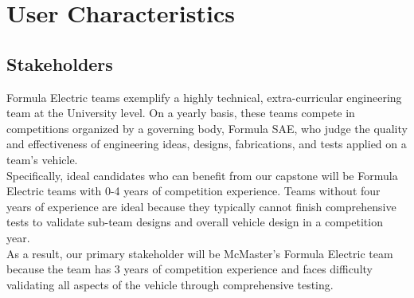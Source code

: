 \documentclass[12pt,titlepage]{article}
\begin{document}
\section{User Characteristics}

\subsection{Stakeholders}

Formula Electric teams exemplify a highly technical, extra-curricular engineering
team at the University level. On a yearly basis, these teams compete in 
competitions organized by a governing body, Formula SAE, who judge the quality
and effectiveness of engineering ideas, designs, fabrications, and tests applied
on a team’s vehicle.\\ 

Specifically, ideal candidates who can benefit from our capstone will be Formula
Electric teams with 0-4 years of competition experience. Teams without
four years of experience are ideal because they typically cannot finish comprehensive 
tests to validate sub-team designs and overall vehicle design in a
competition year.\\ 

As a result, our primary stakeholder will be McMaster’s Formula Electric
team because the team has 3 years of competition experience and faces difficulty
validating all aspects of the vehicle through comprehensive testing.

\newpage
\end{document}

